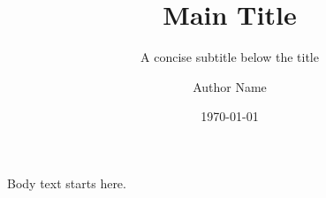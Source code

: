 \documentclass[12pt]{article}
\title{Main Title}
\subtitle{A concise subtitle below the title}
\author{Author Name}
\date{\today}
\begin{document}
\maketitle

Body text starts here.
\end{document}
